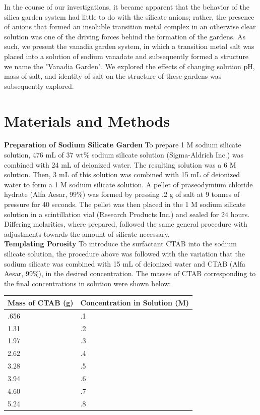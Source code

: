 \documentclass[
journal=jacsat, %
manuscript=article]{achemso}
\begin{document}
In the course of our investigations, it became apparent that the behavior of the silica garden system had little to do with the silicate anions; rather, the presence of anions that formed an insoluble transition metal complex in an otherwise clear solution was one of the driving forces behind the formation of the gardens. As such, we present the vanadia garden system, in which a transition metal salt was placed into a solution of sodium vanadate and subsequently formed a structure we name the "Vanadia Garden". We explored the effects of changing solution pH, mass of salt, and identity of salt on the structure of these gardens was subsequently explored.

\section*{Materials and Methods}
\textbf{Preparation of Sodium Silicate Garden} To prepare 1 M sodium silicate solution, 476 mL of 37 wt\% sodium silicate solution (Sigma-Aldrich Inc.) was combined with 24 mL of deionized water. The resulting solution was a 6 M solution. Then, 3 mL of this solution was combined with 15 mL of deionized water to form a 1 M sodium silicate solution. A pellet of praseodymium chloride hydrate (Alfa Aesar, 99\%) was formed by pressing .2 g of salt at 9 tonnes of pressure for 40 seconds. The pellet was then placed in the 1 M sodium silicate solution in a scintillation vial (Research Products Inc.) and sealed for 24 hours. Differing molarities, where prepared, followed the same general procedure with adjustments towards the amount of silicate necessary.
~\\
\textbf{Templating Porosity} To introduce the surfactant CTAB into the sodium silicate solution, the procedure above was followed with the variation that the sodium silicate was combined with 15 mL of deionized water and CTAB (Alfa Aesar, 99\%), in the desired concentration. The masses of CTAB corresponding to the final concentrations in solution were shown below: \\
\begin{center}
    \begin{tabular}{| l | l |}
    \hline
    Mass of CTAB (g) & Concentration in Solution (M)\\ \hline
    .656 & .1 \\ \hline
    1.31 & .2  \\ \hline
    1.97 & .3  \\ \hline
    2.62 & .4  \\ \hline
    3.28 & .5  \\ \hline
    3.94 & .6  \\ \hline
    4.60 & .7  \\ \hline
    5.24 & .8  \\ \hline
    \end{tabular}
\end{center} 
\end{document}
